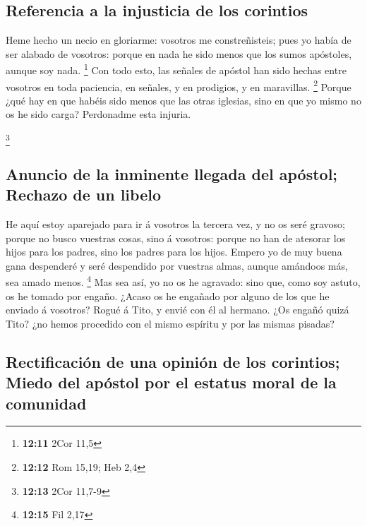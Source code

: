 \hypertarget{referencia-a-la-injusticia-de-los-corintios}{%
\subsection{Referencia a la injusticia de los
corintios}\label{referencia-a-la-injusticia-de-los-corintios}}

 Heme hecho un necio en gloriarme: vosotros me
constreñisteis; pues yo había de ser alabado de vosotros: porque en nada
he sido menos que los sumos apóstoles, aunque soy nada. \footnote{\textbf{12:11}
  2Cor 11,5}  Con todo esto, las señales de apóstol han
sido hechas entre vosotros en toda paciencia, en señales, y en
prodigios, y en maravillas. \footnote{\textbf{12:12} Rom 15,19; Heb 2,4}
 Porque ¿qué hay en que habéis sido menos que las otras
iglesias, sino en que yo mismo no os he sido carga? Perdonadme esta
injuria.

\footnote{\textbf{12:13} 2Cor 11,7-9}

\hypertarget{anuncio-de-la-inminente-llegada-del-apuxf3stol-rechazo-de-un-libelo}{%
\subsection{Anuncio de la inminente llegada del apóstol; Rechazo de un
libelo}\label{anuncio-de-la-inminente-llegada-del-apuxf3stol-rechazo-de-un-libelo}}

 He aquí estoy aparejado para ir á vosotros la tercera vez,
y no os seré gravoso; porque no busco vuestras cosas, sino á vosotros:
porque no han de atesorar los hijos para los padres, sino los padres
para los hijos.  Empero yo de muy buena gana despenderé y
seré despendido por vuestras almas, aunque amándoos más, sea amado
menos. \footnote{\textbf{12:15} Fil 2,17}  Mas sea así, yo
no os he agravado: sino que, como soy astuto, os he tomado por engaño.
 ¿Acaso os he engañado por alguno de los que he enviado á
vosotros?  Rogué á Tito, y envié con él al hermano. ¿Os
engañó quizá Tito? ¿no hemos procedido con el mismo espíritu y por las
mismas pisadas?

\hypertarget{rectificaciuxf3n-de-una-opiniuxf3n-de-los-corintios-miedo-del-apuxf3stol-por-el-estatus-moral-de-la-comunidad}{%
\subsection{Rectificación de una opinión de los corintios; Miedo del
apóstol por el estatus moral de la
comunidad}\label{rectificaciuxf3n-de-una-opiniuxf3n-de-los-corintios-miedo-del-apuxf3stol-por-el-estatus-moral-de-la-comunidad}}

